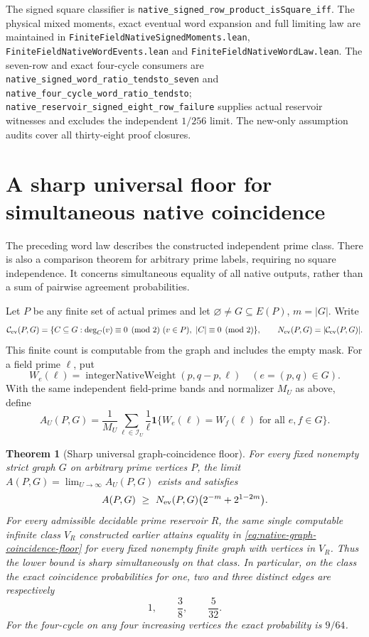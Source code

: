 \documentclass[11pt]{article}
\newtheorem{theorem}{Theorem}[section]
\begin{document}
The signed square classifier is
\texttt{native\_signed\_row\_product\_isSquare\_iff}.
The physical mixed moments, exact eventual word expansion and full
limiting law are maintained in
\texttt{FiniteFieldNativeSignedMoments.lean},
\texttt{FiniteFieldNativeWordEvents.lean} and
\texttt{FiniteFieldNativeWordLaw.lean}.
The seven-row and exact four-cycle consumers are
\texttt{native\_signed\_word\_ratio\_tendsto\_seven} and
\texttt{native\_four\_cycle\_word\_ratio\_tendsto};
\texttt{native\_reservoir\_signed\_eight\_row\_failure}
supplies actual reservoir witnesses and excludes the independent
\(1/256\) limit.
The new-only assumption audits cover all thirty-eight proof closures.

\section{A sharp universal floor for simultaneous native coincidence}
\label{sec:native-graph-coincidence}

The preceding word law describes the constructed independent prime class.
There is also a comparison theorem for arbitrary prime labels, requiring
no square independence. It concerns simultaneous equality of all native
outputs, rather than a sum of pairwise agreement probabilities.

Let \(P\) be any finite set of actual primes and let
\(\varnothing\ne G\subseteq E(P)\), \(m=|G|\).
Write
\[
 \mathcal C_{\rm ev}(P,G)=
 \{C\subseteq G:\deg_C(v)\equiv0\pmod2\ (v\in P),\
                         |C|\equiv0\pmod2\},\qquad
 N_{\rm ev}(P,G)=|\mathcal C_{\rm ev}(P,G)|.
\]
This finite count is computable from the graph and includes the empty
mask. For a field prime \(\ell\), put
\[
 W_e(\ell)=\operatorname{integerNativeWeight}(p,q-p,\ell)
       \quad(e=(p,q)\in G).
\]
With the same independent field-prime bands and normalizer \(M_U\) as
above, define
\[
 A_U(P,G)=\frac1{M_U}\sum_{\ell\in\mathcal I_U}\frac1\ell
     \mathbf1\{W_e(\ell)=W_f(\ell)\text{ for all }e,f\in G\}.
\]

\begin{theorem}[Sharp universal graph-coincidence floor]
\label{thm:native-graph-coincidence}
For every fixed nonempty strict graph \(G\) on arbitrary prime
vertices \(P\), the limit \(A(P,G)=\lim_{U\to\infty}A_U(P,G)\)
exists and satisfies
\begin{equation}\label{eq:native-graph-coincidence-floor}
 A(P,G)\ \geq\
 N_{\rm ev}(P,G)\bigl(2^{-m}+2^{1-2m}\bigr).
\end{equation}
For every admissible decidable prime reservoir \(R\), the same single
computable infinite class \(V_R\) constructed earlier attains equality
in \eqref{eq:native-graph-coincidence-floor} for every fixed nonempty
finite graph with vertices in \(V_R\).
Thus the lower bound is sharp simultaneously on that class.
In particular, on the class the exact coincidence probabilities for
one, two and three distinct edges are respectively
\[
 1,\qquad \frac38,\qquad \frac5{32}.
\]
For the four-cycle on any four increasing vertices the exact probability
is \(9/64\).
\end{theorem}
\end{document}

